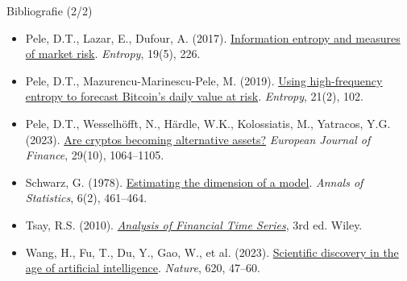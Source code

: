 \begin{frame}{Bibliografie (2/2)}
\begin{itemize}
    \item Pele, D.T., Lazar, E., Dufour, A. (2017). \href{https://doi.org/10.3390/e19050226}{Information entropy and measures of market risk}. \textit{Entropy}, 19(5), 226.
    \item Pele, D.T., Mazurencu-Marinescu-Pele, M. (2019). \href{https://doi.org/10.3390/e21020102}{Using high-frequency entropy to forecast Bitcoin's daily value at risk}. \textit{Entropy}, 21(2), 102.
    \item Pele, D.T., Wesselhöfft, N., Härdle, W.K., Kolossiatis, M., Yatracos, Y.G. (2023). \href{https://doi.org/10.1080/1351847x.2021.1960403}{Are cryptos becoming alternative assets?} \textit{European Journal of Finance}, 29(10), 1064--1105.
    \item Schwarz, G. (1978). \href{https://doi.org/10.1214/aos/1176344136}{Estimating the dimension of a model}. \textit{Annals of Statistics}, 6(2), 461--464.
    \item Tsay, R.S. (2010). \href{https://doi.org/10.1002/9780470644560}{\textit{Analysis of Financial Time Series}}, 3rd ed. Wiley.
    \item Wang, H., Fu, T., Du, Y., Gao, W., et al. (2023). \href{https://doi.org/10.1038/s41586-023-06221-2}{Scientific discovery in the age of artificial intelligence}. \textit{Nature}, 620, 47--60.
\end{itemize}
\end{frame}



